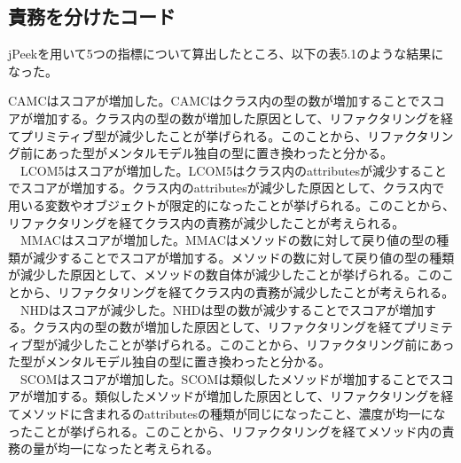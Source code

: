 \documentclass[11pt, a4paper]{jreport}
\begin{document}
\subsection{責務を分けたコード}
jPeekを用いて5つの指標について算出したところ、以下の表5.1のような結果になった。
\begin{table}[H]
\centering
\caption{jPeekによる算出結果}
\label{ttt}
\end{table}
CAMCはスコアが増加した。CAMCはクラス内の型の数が増加することでスコアが増加する。クラス内の型の数が増加した原因として、リファクタリングを経てプリミティブ型が減少したことが挙げられる。このことから、リファクタリング前にあった型がメンタルモデル独自の型に置き換わったと分かる。
\\　LCOM5はスコアが増加した。LCOM5はクラス内のattributesが減少することでスコアが増加する。クラス内のattributesが減少した原因として、クラス内で用いる変数やオブジェクトが限定的になったことが挙げられる。このことから、リファクタリングを経てクラス内の責務が減少したことが考えられる。
\\　MMACはスコアが増加した。MMACはメソッドの数に対して戻り値の型の種類が減少することでスコアが増加する。メソッドの数に対して戻り値の型の種類が減少した原因として、メソッドの数自体が減少したことが挙げられる。このことから、リファクタリングを経てクラス内の責務が減少したことが考えられる。
\\　NHDはスコアが減少した。NHDは型の数が減少することでスコアが増加する。クラス内の型の数が増加した原因として、リファクタリングを経てプリミティブ型が減少したことが挙げられる。このことから、リファクタリング前にあった型がメンタルモデル独自の型に置き換わったと分かる。
\\　SCOMはスコアが増加した。SCOMは類似したメソッドが増加することでスコアが増加する。類似したメソッドが増加した原因として、リファクタリングを経てメソッドに含まれるのattributesの種類が同じになったこと、濃度が均一になったことが挙げられる。このことから、リファクタリングを経てメソッド内の責務の量が均一になったと考えられる。
\end{document}
